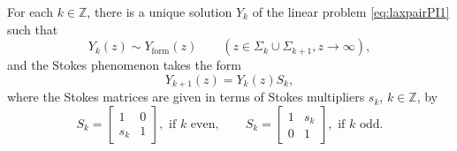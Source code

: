 \documentclass[a4paper,reqno]{amsart}
\numberwithin{equation}{section}
\newcommand{\Z}{\mathbb{Z}}
\numberwithin{equation}{section}
\begin{document}
For each $k\in \Z$, there is a unique solution $Y_k$ of the linear problem \eqref{eq:laxpairPI1} such that 
$$Y_k(z)\sim Y_{\operatorname{form}}(z) \qquad (z\in \Sigma_k\cup \Sigma_{k+1}, z\to \infty),$$
and the Stokes phenomenon takes the form
$$Y_{k+1}(z) = Y_k(z) S_k,$$
where the Stokes matrices are given in terms of Stokes multipliers $s_k$,  $k\in \Z$, by
$$S_k = \begin{bmatrix}
    1 & 0 \\
    s_k & 1
\end{bmatrix},
 \text{ if } k \text{ even},
 \qquad
 S_k = \begin{bmatrix}
    1 & s_k \\
    0 & 1
\end{bmatrix},
 \text{ if } k \text{ odd}.
 $$
\end{document}
